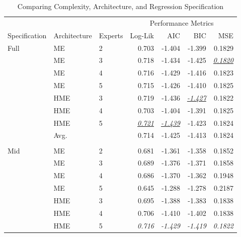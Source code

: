 \documentclass[12pt]{article}
\newcommand{\iu}[1]{\underline{\textit{#1}}}
\theoremstyle{definition}
\begin{document}
\begin{table}[b!] \centering
  \caption{Comparing Complexity, Architecture, and Regression Specification}
  \begin{threeparttable}
    {\footnotesize
    \begin{tabular}[r]{l l l r r r r}
  \cmidrule{1-7}
         &       &         &  \multicolumn{4}{c}{Performance Metrics} \\ 
   \cmidrule(l){4-7}
Specification & Architecture  & Experts & Log-Lik & AIC    & BIC    & MSE   \\ 
  \cmidrule{1-7}

Full     &  ME   &    2    & 0.703      & -1.404      & -1.399      & 0.1829      \\
         &  ME   &    3    & 0.718      & -1.434      & -1.425      & \iu{0.1820} \\
         &  ME   &    4    & 0.716      & -1.429      & -1.416      & 0.1823      \\
         &  ME   &    5    & 0.715      & -1.426      & -1.410      & 0.1825      \\
         &  HME  &    3    & 0.719      & -1.436      & \iu{-1.427} & 0.1822      \\
         &  HME  &    4    & 0.703      & -1.404      & -1.391      & 0.1825      \\
         &  HME  &    5    & \iu{0.721} & \iu{-1.439} & -1.423      & 0.1824      \\
         \cmidrule(l){2-7}
         &  Avg. &         & 0.714      & -1.425      & -1.413      & 0.1824      \\
         \cmidrule(l){2-7}
         &       &         &            &             &             &             \\
Mid      &  ME   &    2    & 0.681      & -1.361      & -1.358      & 0.1852      \\
         &  ME   &    3    & 0.689      & -1.376      & -1.371      & 0.1858      \\
         &  ME   &    4    & 0.686      & -1.370      & -1.362      & 0.1948      \\
         &  ME   &    5    & 0.645      & -1.288      & -1.278      & 0.2187      \\
         &  HME  &    3    & 0.695      & -1.388      & -1.383      & 0.1838      \\
         &  HME  &    4    & 0.706      & -1.410      & -1.402      & 0.1838      \\
         &  HME  &    5    & \it{0.716} & \it{-1.429} & \it{-1.419} & \it{0.1822} \\

\end{tabular}}
\end{threeparttable}
\end{table}
\end{document}
